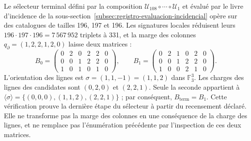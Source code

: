 Le sélecteur terminal défini par la composition
\(\mathcal U_{108}\circ\cdots\circ\mathcal U_1\) et évalué par le livre
d'incidence de la sous-section~\ref{subsec:registro-evaluacion-incidencial}
opère sur des catalogues de tailles 196, 197 et 196. Les signatures locales réduisent leurs
\(196\cdot197\cdot196=7\,567\,952\) triplets à 331, et la marge des
colonnes \(q_{\partial}=(1,2,2,1,2,0)\) laisse deux matrices :
\[
 B_0=\begin{pmatrix}0&2&0&2&2&0\\0&0&1&2&2&0\\1&0&1&0&1&0\end{pmatrix},
 \qquad
 B_1=\begin{pmatrix}0&2&1&0&2&0\\0&0&1&2&2&0\\1&0&0&2&1&0\end{pmatrix}.
\]
L'orientation des lignes est \(\sigma=(1,1,-1)=(1,1,2)\) dans
\(\mathbb F_3^3\). Les charges des lignes des candidates sont
\((0,2,0)\) et \((2,2,1)\). Seule la seconde appartient à
\(\langle\sigma\rangle=\{(0,0,0),(1,1,2),(2,2,1)\}\) ; par conséquent,
\(B_{\mathrm{term}}=B_1\). Cette vérification prouve la dernière étape du
sélecteur à partir du recensement déclaré. Elle ne transforme pas la marge des colonnes
en une conséquence de la charge des lignes, et ne remplace pas l'énumération
précédente par l'inspection de ces deux matrices.

